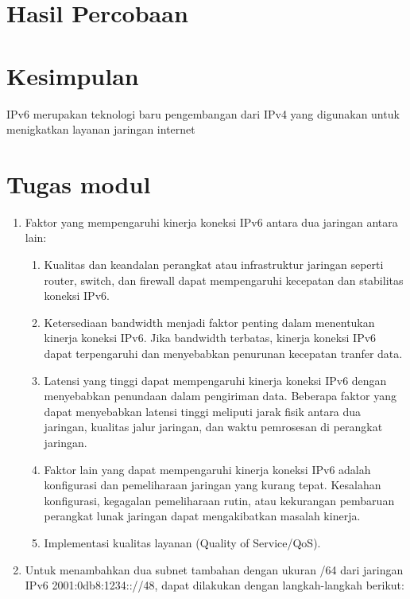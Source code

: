 \section{Hasil Percobaan}


\section{Kesimpulan}

IPv6 merupakan teknologi baru pengembangan dari IPv4 yang digunakan untuk menigkatkan layanan jaringan internet 

\section{Tugas modul}

\begin{enumerate}
    \item Faktor yang mempengaruhi kinerja koneksi IPv6 antara dua jaringan antara lain:
    \begin{enumerate}
        \item Kualitas dan keandalan perangkat atau infrastruktur jaringan seperti router, switch, dan firewall dapat mempengaruhi kecepatan dan stabilitas koneksi IPv6.
        \item Ketersediaan bandwidth menjadi faktor penting dalam menentukan kinerja koneksi IPv6. Jika bandwidth terbatas, kinerja koneksi IPv6 dapat terpengaruhi dan menyebabkan penurunan kecepatan tranfer data.
        \item Latensi yang tinggi dapat mempengaruhi kinerja koneksi IPv6 dengan menyebabkan penundaan dalam pengiriman data. Beberapa faktor yang dapat menyebabkan latensi tinggi meliputi jarak fisik antara dua jaringan, kualitas jalur jaringan, dan waktu pemrosesan di perangkat jaringan.
        \item Faktor lain yang dapat mempengaruhi kinerja koneksi IPv6 adalah konfigurasi dan pemeliharaan jaringan yang kurang tepat. Kesalahan konfigurasi, kegagalan pemeliharaan rutin, atau kekurangan pembaruan perangkat lunak jaringan dapat mengakibatkan masalah kinerja.
        \item Implementasi kualitas layanan (Quality of Service/QoS).
    \end{enumerate}
    
    \item Untuk menambahkan dua subnet tambahan dengan ukuran /64 dari jaringan IPv6 2001:0db8:1234:://48, dapat dilakukan dengan langkah-langkah berikut:
    

\end{enumerate}
